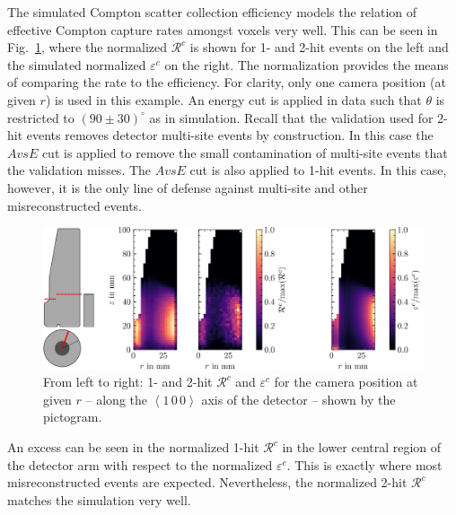 The simulated Compton scatter collection efficiency models the relation of effective Compton capture rates amongst voxels very well. This can be seen in Fig.~\ref{fig:rate_vs_acceptance}, where the normalized $\mathcal{R}^c$ is shown for 1- and 2-hit events on the left and the simulated normalized $\varepsilon^{c}$ on the right. The normalization provides the means of comparing the rate to the efficiency. For clarity, only one camera position (at given $r$) is used in this example. An energy cut is applied in data such that $\theta$ is restricted to $(90\pm30)^\circ$ as in simulation. Recall that the validation used for 2-hit events removes detector multi-site events by construction. In this case the $AvsE$ cut is applied to remove the small contamination of multi-site events that the validation misses. The $AvsE$ cut is also applied to 1-hit events. In this case, however, it is the only line of defense against multi-site and other misreconstructed events.
\begin{figure}[htb]
    \centering
    \includegraphics[width=6in]{figs/trapping/rate_vs_acceptance.png}
    \caption{From left to right: 1- and 2-hit $\mathcal{R}^c$ and $\varepsilon^{c}$ for the camera position at given $r$ -- along the $\left<1\,0\,0\right>$ axis of the detector -- shown by the pictogram.}
	\label{fig:rate_vs_acceptance}
\end{figure}

An excess can be seen in the normalized 1-hit $\mathcal{R}^c$ in the lower central region of the detector arm with respect to the normalized $\varepsilon^c$. This is exactly where most misreconstructed events are expected. Nevertheless, the normalized 2-hit $\mathcal{R}^c$ matches the simulation very well. 

